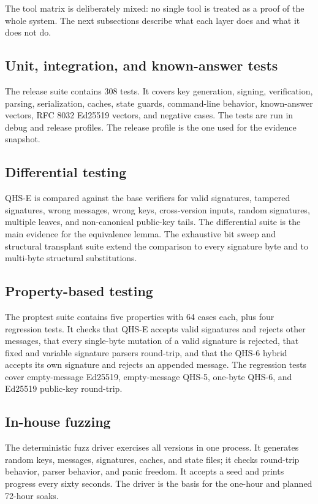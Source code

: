 \documentclass[11pt,a4paper]{article}
\begin{document}
The tool matrix is deliberately mixed: no single tool is treated as a proof of
the whole system. The next subsections describe what each layer does and what it
does not do.

\subsection{Unit, integration, and known-answer tests}

The release suite contains 308 tests. It covers key generation, signing,
verification, parsing, serialization, caches, state guards, command-line
behavior, known-answer vectors, RFC 8032 Ed25519 vectors, and negative cases.
The tests are run in debug and release profiles. The release profile is the
one used for the evidence snapshot.

\subsection{Differential testing}

QHS-E is compared against the base verifiers for valid signatures, tampered
signatures, wrong messages, wrong keys, cross-version inputs, random
signatures, multiple leaves, and non-canonical public-key tails. The
differential suite is the main evidence for the equivalence lemma. The
exhaustive bit sweep and structural transplant suite extend the comparison to
every signature byte and to multi-byte structural substitutions.

\subsection{Property-based testing}

The proptest suite contains five properties with 64 cases each, plus four
regression tests. It checks that QHS-E accepts valid signatures and rejects
other messages, that every single-byte mutation of a valid signature is
rejected, that fixed and variable signature parsers round-trip, and that the
QHS-6 hybrid accepts its own signature and rejects an appended message. The
regression tests cover empty-message Ed25519, empty-message QHS-5, one-byte
QHS-6, and Ed25519 public-key round-trip.

\subsection{In-house fuzzing}

The deterministic fuzz driver exercises all versions in one process. It
generates random keys, messages, signatures, caches, and state files; it checks
round-trip behavior, parser behavior, and panic freedom. It accepts a seed and
prints progress every sixty seconds. The driver is the basis for the one-hour
and planned 72-hour soaks.
\end{document}
